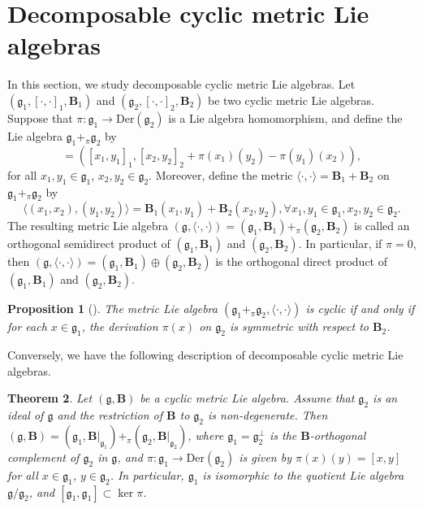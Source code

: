 \documentclass[reqno]{amsart}
\newtheorem{thm}{Theorem}[section]
\newtheorem{prop}[thm]{Proposition}
\theoremstyle{definition}
\begin{document}
\section{Decomposable cyclic metric Lie algebras}\label{sec3}
In this section, we study decomposable cyclic metric Lie algebras.
Let $(\mathfrak{g}_{1},[\cdot,\cdot]_{1},\mathbf{B}_{1})$
 and $(\mathfrak{g}_{2},[\cdot,\cdot]_{2},\mathbf{B}_{2})$ be two cyclic metric Lie algebras.
 Suppose that $\pi: \mathfrak{g}_{1}\rightarrow \mathrm{Der}(\mathfrak{g}_{2})$ is a Lie algebra homomorphism,
 and define the Lie algebra $\mathfrak{g}_{1}+_{\pi}\mathfrak{g}_{2}$ by
\begin{equation*}
[(x_{1},x_{2}),(y_{1},y_{2})]=([x_{1},y_{1}]_{1},[x_{2},y_{2}]_{2}+\pi(x_{1})(y_{2})-\pi(y_{1})(x_{2})),
\end{equation*}
for all $x_{1},y_{1}\in\mathfrak{g}_{1}$, $x_{2},y_{2}\in\mathfrak{g}_{2}$. Moreover, define the metric $\langle\cdot,\cdot\rangle=\mathbf{B}_{1}+\mathbf{B}_{2}$ on $\mathfrak{g}_{1}+_{\pi}\mathfrak{g}_{2}$ by
\begin{equation*}
\langle (x_{1},x_{2}),(y_{1},y_{2})\rangle=\mathbf{B}_{1}(x_{1},y_{1})+\mathbf{B}_{2}(x_{2},y_{2}), \forall x_{1},y_{1}\in\mathfrak{g}_{1}, x_{2},y_{2}\in\mathfrak{g}_{2}.
\end{equation*}
The resulting metric Lie algebra $(\mathfrak{g},\langle\cdot,\cdot\rangle)
=(\mathfrak{g}_{1},\mathbf{B}_{1})
+_{\pi}(\mathfrak{g}_{2},\mathbf{B}_{2})$ is called an orthogonal
semidirect product of $(\mathfrak{g}_{1},\mathbf{B}_{1})$ and
$(\mathfrak{g}_{2},\mathbf{B}_{2})$.
In particular, if  $\pi=0$,
then $(\mathfrak{g},\langle\cdot,\cdot\rangle)
=(\mathfrak{g}_{1},\mathbf{B}_{1})
\oplus(\mathfrak{g}_{2},\mathbf{B}_{2})$ is the orthogonal
direct product of $(\mathfrak{g}_{1},\mathbf{B}_{1})$  and $(\mathfrak{g}_{2},\mathbf{B}_{2})$.
\begin{prop}[\cite{ggo15}]\label{2-prop-pi}
The metric Lie algebra $(\mathfrak{g}_{1}+_{\pi}\mathfrak{g}_{2}, \langle\cdot,\cdot\rangle)$ is cyclic if and only if for each $x\in\mathfrak{g}_{1}$, the derivation $\pi(x)$ on $\mathfrak{g}_{2}$ is symmetric with respect to $\mathbf{B}_{2}$.
\end{prop}
Conversely, we have the following description of decomposable cyclic metric Lie algebras.
\begin{thm}\label{2-thm-decom}
Let $(\mathfrak{g},\mathbf{B})$ be a cyclic metric Lie algebra. Assume that $\mathfrak{g}_{2}$ is an ideal of $\mathfrak{g}$ and
 the restriction of $\mathbf{B}$ to $\mathfrak{g}_{2}$ is non-degenerate.
 Then $(\mathfrak{g},\mathbf{B})
=(\mathfrak{g}_{1},\mathbf{B}|_{\mathfrak{g}_{1}})
+_{\pi}(\mathfrak{g}_{2},\mathbf{B}|_{\mathfrak{g}_{2}})$, where
 $\mathfrak{g}_{1}=\mathfrak{g}_{2}^{\perp}$ is the $\mathbf{B}$-orthogonal complement of $\mathfrak{g}_{2}$ in  $\mathfrak{g}$,
and $\pi:\mathfrak{g}_{1}\rightarrow \mathrm{Der}(\mathfrak{g}_{2})$ is given by $\pi(x)(y)=[x,y]$
for all $ x\in\mathfrak{g}_{1}$, $y\in\mathfrak{g}_{2}$. In particular, $\mathfrak{g}_{1}$ is isomorphic to the quotient Lie algebra $\mathfrak{g}/\mathfrak{g}_{2}$, and $[\mathfrak{g}_{1},\mathfrak{g}_{1}]\subset \ker \pi$.
\end{thm}
\end{document}
